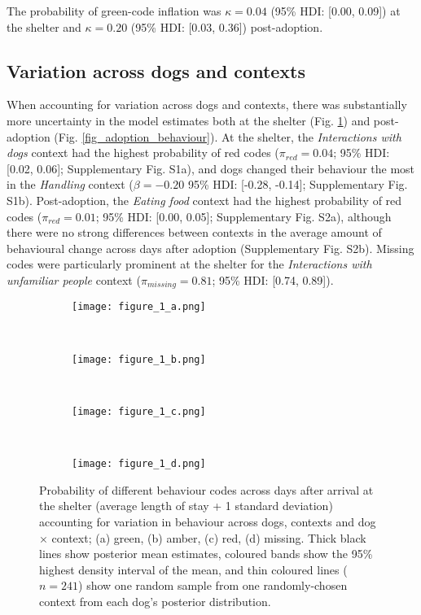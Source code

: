 \documentclass[fleqn,10pt]{wlscirep}
\begin{document}
The probability of green-code inflation was $\kappa = 0.04$ (95\% HDI: [0.00, 0.09]) at the shelter and $\kappa = 0.20$ (95\% HDI: [0.03, 0.36]) post-adoption.

\subsection*{Variation across dogs and contexts}
When accounting for variation across dogs and contexts, there was substantially more uncertainty in the model estimates both at the shelter (Fig. \ref{fig_shelter_behaviour}) and post-adoption (Fig. \ref{fig_adoption_behaviour}). At the shelter, the \textit{Interactions with dogs} context had the highest probability of red codes ($\pi_{red} = 0.04$; 95\% HDI: [0.02, 0.06]; Supplementary Fig. S1a), and dogs changed their behaviour the most in the \textit{Handling} context ($\beta = -0.20$ 95\% HDI: [-0.28, -0.14]; Supplementary Fig. S1b). Post-adoption, the \textit{Eating food}
context had the highest probability of red codes ($\pi_{red} = 0.01$; 95\% HDI: [0.00, 0.05]; Supplementary Fig. S2a), although there were no strong differences between contexts in the average amount of behavioural change across days after adoption (Supplementary Fig. S2b). Missing codes were particularly prominent at the shelter for the \textit{Interactions with unfamiliar people} context ($\pi_{missing} = 0.81$; 95\% HDI: [0.74, 0.89]).


\begin{figure}[t!]
  \hspace{-2cm}%
  \begin{subfigure}{0.4\textwidth}
    \centering
    \texttt{[image: figure\_1\_a.png]}
  \end{subfigure}%
  ~%
  \hspace{-2cm}
  \begin{subfigure}{0.4\textwidth}
    \centering
    \texttt{[image: figure\_1\_b.png]}
  \end{subfigure}%
  ~%
  \hspace{-2cm}
  \begin{subfigure}{0.4\textwidth}
    \centering
    \texttt{[image: figure\_1\_c.png]}
  \end{subfigure}%
  ~%
  \hspace{-2cm}
  \begin{subfigure}{0.4\textwidth}
    \centering
    \texttt{[image: figure\_1\_d.png]}
  \end{subfigure}%

  \caption{Probability of different behaviour codes across days after arrival at the shelter (average length of stay + 1 standard deviation) accounting for variation in behaviour across dogs, contexts and dog $\times$ context; (a) green, (b) amber, (c) red, (d) missing. Thick black lines show posterior mean estimates, coloured bands show the 95\% highest density interval of the mean, and thin coloured lines ($n = 241$) show one random sample from one randomly-chosen context from each dog's posterior distribution.}
  \label{fig_shelter_behaviour}
\end{figure}
\end{document}
